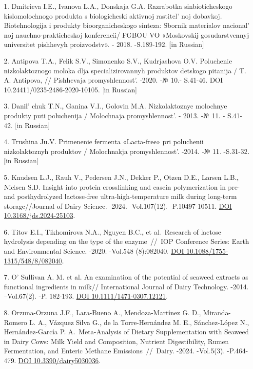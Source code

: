 \begin{refs}
1. Dmitrieva I.E., Ivanova L.A., Donskaja G.A. Razrabotka
sinbioticheskogo kislomolochnogo produkta s biologicheski aktivnoj
rastitel' noj dobavkoj. Biotehnologija i produkty
bioorganicheskogo sinteza: Sbornik materialov
nacional' noj nauchno-prakticheskoj konferencii/ FGBOU VO
«Moskovskij gosudarstvennyj universitet pishhevyh proizvodstv». - 2018.
-S.189-192. {[}in Russian{]}

2. Antipova T.A., Felik S.V., Simonenko S.V., Kudrjashova O.V.
Poluchenie nizkolaktoznogo moloka dlja specializirovannyh produktov
detskogo pitanija / T. A. Antipova, // Pishhevaja
promyshlennost'. -2020. -№ 10.- S.41-46. DOI
10.24411/0235-2486-2020-10105. {[}in Russian{]}

3. Danil' chuk T.N., Ganina V.I., Golovin M.A.
Nizkolaktoznye molochnye produkty puti poluchenija / Molochnaja
promyshlennost'. - 2013. -№ 11. - S.41-42. {[}in
Russian{]}

4. Trushina Ju.V. Primenenie fermenta «Lacta-free» pri poluchenii
nizkolaktoznyh produktov / Molochnakja promyshlennost'.
-2014. -№ 11. -S.31-32. {[}in Russian{]}

5. Knudsen L.J., Rauh V., Pedersen J.N., Dekker P., Otzen D.E., Larsen
L.B., Nielsen S.D. Insight into protein crosslinking and casein
polymerization in pre- and posthydrolyzed lactose-free
ultra-high-temperature milk during long-term storage//Journal of Dairy
Science. -2024. -Vol.107(12). -P.10497-10511.
\href{https://doi.org/10.3168/jds.2024-25103}{DOI
10.3168/jds.2024-25103}.

6. Titov E.I., Tikhomirova N.A., Nguyen B.C., et al.~Research of lactose
hydrolysis depending on the type of the enzyme~//~IOP Conference Series:
Earth and Environmental Science. -2020. -Vol.548 (8):082040.
\href{https://doi.org/0.1088/1755-1315/548/8/082040}{DOI
10.1088/1755-1315/548/8/082040}.

7. O' Sullivan A. M. et al. An examination of the
potential of seaweed extracts as functional ingredients in milk//
International Journal of Dairy Technology. -2014. --Vol.67(2). -P.
182-193. \href{https://doi.org/10.1111/1471-0307.12121}{DOI
10.1111/1471-0307.12121}.

8. Orzuna-Orzuna J.F., Lara-Bueno A., Mendoza-Martínez G. D.,
Miranda-Romero L. A., Vázquez Silva G., de la Torre-Hernández M. E.,
Sánchez-López N., Hernández-García P. A.~Meta-Analysis of Dietary
Supplementation with Seaweed in Dairy Cows: Milk Yield and Composition,
Nutrient Digestibility, Rumen Fermentation, and Enteric Methane
Emissions~//~Dairy. -2024. -Vol.5(3). -P.464-479.
\href{https://doi.org/10.3390/dairy5030036}{DOI 10.3390/dairy5030036}.


\end{refs}
